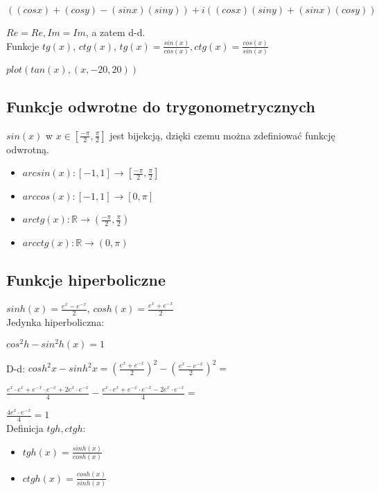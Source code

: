 \documentclass{article}
\theoremstyle{definition}
\theoremstyle{definition}
\theoremstyle{definition}
\theoremstyle{definition}
\begin{document}
$((cosx)+(cosy)-(sinx)(siny))+i((cosx)(siny)+(sinx)(cosy))$

$Re = Re, Im=Im$, a zatem d-d.\\

Funkcje $tg(x)$, $ctg(x)$, $tg(x)=\frac{sin(x)}{cos(x)}, ctg(x)=\frac{cos(x)}{sin(x)}$

$plot(tan(x),(x,-20,20))$\\

\subsection{Funkcje odwrotne do trygonometrycznych}

$sin(x)$ w $x\in[\frac{-\pi}{2},\frac{\pi}{2}]$ jest bijekcją, dzięki czemu można zdefiniować funkcję odwrotną.

\begin{itemize}
    \item $arcsin(x): [-1,1]\rightarrow[\frac{-\pi}{2},\frac{\pi}{2}]$
    \item $arccos(x): [-1,1]\rightarrow[0,\pi]$
    \item $arctg(x): \mathbb{R}\rightarrow (\frac{-\pi}{2},\frac{\pi}{2})$
    \item $arcctg(x): \mathbb{R}\rightarrow (0,\pi)$
\end{itemize}

\subsection{Funkcje hiperboliczne}

$sinh(x)=\frac{e^x-e^{-x}}{2}$, $cosh(x)=\frac{e^x+e^{-x}}{2}$\\

Jedynka hiperboliczna:

\begin{center}
    $cos^2h-sin^2h(x)=1$
\end{center}

D-d:
$cosh^2{x}-sinh^2{x}=(\frac{e^x+e^{-x}}{2})^2-(\frac{e^x-e^{-x}}{2})^2=$

$\frac{e^x\cdot e^x + e^{-x}\cdot e^{-x} + 2e^x\cdot e^{-x}}{4}-\frac{e^x\cdot e^x + e^{-x}\cdot e^{-x} - 2e^x\cdot e^{-x}}{4}=$

$\frac{4 e^x \cdot e^{-x}}{4}=1$\\

Definicja $tgh, ctgh$:
\begin{itemize}
    \item $tgh(x)=\frac{sinh(x)}{cosh(x)}$
    \item $ctgh(x)=\frac{cosh(x)}{sinh(x)}$
\end{itemize}
\end{document}
